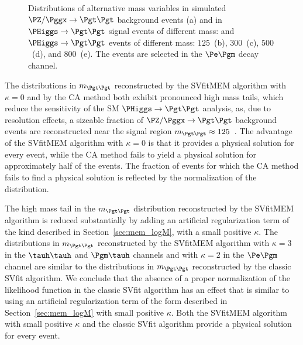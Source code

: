 \begin{figure}
\begin{center}
\end{center}
\caption{
  Distributions of alternative mass variables in simulated $\PZ/\Pggx \to \Pgt\Pgt$ background events (a) 
  and in $\PHiggs \to \Pgt\Pgt$ signal events of different mass:
  and $\PHiggs \to \Pgt\Pgt$ events of different mass:
  $125$~\GeV (b), $300$~\GeV (c), $500$~\GeV (d), and $800$~\GeV (e).
  The events are selected in the $\Pe\Pgm$ decay channel.
}
\label{fig:massDistributions_emu}
\end{figure}

The distributions in $m_{\Pgt\Pgt}$ reconstructed by the SVfitMEM algorithm with $\kappa = 0$ and by the CA method
both exhibit pronounced high mass tails, which reduce the sensitivity of the SM $\PHiggs \to \Pgt\Pgt$ analysis,
as, due to resolution effects, a sizeable fraction of $\PZ/\Pggx \to \Pgt\Pgt$ background events
are reconstructed near the signal region $m_{\Pgt\Pgt} \approx 125$~\GeV.
The advantage of the SVfitMEM algorithm with $\kappa =
0$ is that it provides a physical solution for every event,
while the CA method fails to yield a physical solution for approximately half of the events.
The fraction of events for which the CA method fails to find a physical solution is reflected by the normalization of the distribution.

The high mass tail in the $m_{\Pgt\Pgt}$ distribution reconstructed by
the SVfitMEM algorithm is reduced substantially by adding an
artificial regularization term of the kind described in
Section~\ref{sec:mem_logM},
with a small positive $\kappa$.
The distributions in $m_{\Pgt\Pgt}$ reconstructed by the SVfitMEM
algorithm with $\kappa = 3$ in the $\tauh\tauh$ and $\Pgm\tauh$ channels and with $\kappa = 2$ in the $\Pe\Pgm$ channel
are similar to the distributions in $m_{\Pgt\Pgt}$ reconstructed by the classic SVfit algorithm.
We conclude that the absence of a proper normalization of the likelihood function in the classic SVfit algorithm
has an effect that is similar to using an artificial regularization term of the form described in Section~\ref{sec:mem_logM} with small positive $\kappa$.
Both the SVfitMEM algorithm with small positive $\kappa$ and the
classic SVfit algorithm provide a physical solution for every event.

